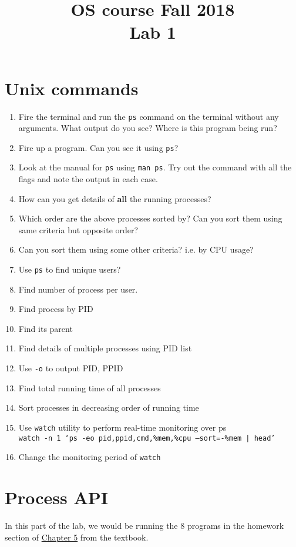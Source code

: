 \documentclass[]{article}
\title{OS course Fall 2018\\Lab 1}
\date{}
\begin{document}
\maketitle
\section{Unix commands}
\begin{enumerate}
	\item Fire the terminal and run the \texttt{ps} command on the terminal without any arguments. What output do you see? Where is this program being run?
	\item Fire up a program. Can you see it using \texttt{ps}?
	\item Look at the manual for \texttt{ps} using \texttt{man ps}. Try out the command with all the flags and note the output in each case.
	\item How can you get details of \textbf{all} the running processes?
	\item Which order are the above processes sorted by? Can you sort them using same criteria but opposite order?
	\item Can you sort them using some other criteria? i.e. by CPU usage?
	\item Use \texttt{ps} to find unique users?
	\item Find number of process per user.
	\item Find process by PID
	\item Find its parent
	\item Find details of multiple processes using PID list
	\item Use \texttt{-o} to output PID, PPID
	\item Find total running time of all processes
	\item Sort processes in decreasing order of running time
	\item Use \texttt{watch} utility to perform real-time monitoring over ps\\
	\texttt{watch -n 1 `ps -eo pid,ppid,cmd,\%mem,\%cpu --sort=-\%mem | head'}
	\item Change the monitoring period of \texttt{watch}
\end{enumerate}

\section{Process API}
In this part of the lab, we would be running the 8 programs in the homework section of \href{http://pages.cs.wisc.edu/~remzi/OSTEP/cpu-api.pdf}{Chapter 5} from the textbook.
\end{document}
